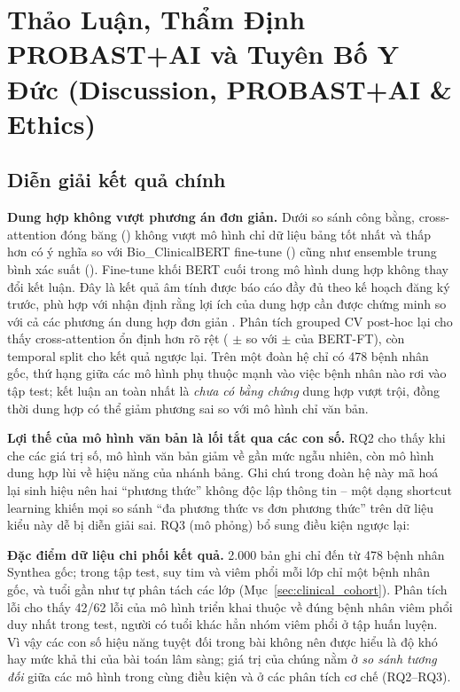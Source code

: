 \section{Thảo Luận, Thẩm Định PROBAST+AI và Tuyên Bố Y Đức (Discussion, PROBAST+AI \& Ethics)}
\label{sec:discussion_ethics}

\subsection{Diễn giải kết quả chính}
\textbf{Dung hợp không vượt phương án đơn giản.} Dưới so sánh công bằng, cross-attention đóng băng (\aucXattn) không vượt mô hình chỉ dữ liệu bảng tốt nhất và thấp hơn có ý nghĩa so với Bio\_ClinicalBERT fine-tune (\aucBertFT) cũng như ensemble trung bình xác suất (\aucEnsemble). Fine-tune khối BERT cuối trong mô hình dung hợp không thay đổi kết luận. Đây là kết quả âm tính được báo cáo đầy đủ theo kế hoạch đăng ký trước, phù hợp với nhận định rằng lợi ích của dung hợp cần được chứng minh so với cả các phương án dung hợp đơn giản \cite{kline2022multimodal}. Phân tích grouped CV post-hoc lại cho thấy cross-attention ổn định hơn rõ rệt (\cvXattn{} $\pm$ \cvsdXattn{} so với \cvBertFT{} $\pm$ \cvsdBertFT{} của BERT-FT), còn temporal split cho kết quả ngược lại. Trên một đoàn hệ chỉ có 478 bệnh nhân gốc, thứ hạng giữa các mô hình phụ thuộc mạnh vào việc bệnh nhân nào rơi vào tập test; kết luận an toàn nhất là \emph{chưa có bằng chứng} dung hợp vượt trội, đồng thời dung hợp có thể giảm phương sai so với mô hình chỉ văn bản.

\textbf{Lợi thế của mô hình văn bản là lối tắt qua các con số.} RQ2 cho thấy khi che các giá trị số, mô hình văn bản giảm về gần mức ngẫu nhiên, còn mô hình dung hợp lùi về hiệu năng của nhánh bảng. Ghi chú trong đoàn hệ này mã hoá lại sinh hiệu nên hai ``phương thức'' không độc lập thông tin -- một dạng shortcut learning \cite{geirhos2020shortcut} khiến mọi so sánh ``đa phương thức vs đơn phương thức'' trên dữ liệu kiểu này dễ bị diễn giải sai. RQ3 (mô phỏng) bổ sung điều kiện ngược lại: 

\textbf{Đặc điểm dữ liệu chi phối kết quả.} 2.000 bản ghi chỉ đến từ 478 bệnh nhân Synthea gốc; trong tập test, suy tim và viêm phổi mỗi lớp chỉ một bệnh nhân gốc, và tuổi gần như tự phân tách các lớp (Mục~\ref{sec:clinical_cohort}). Phân tích lỗi cho thấy 42/62 lỗi của mô hình triển khai thuộc về đúng bệnh nhân viêm phổi duy nhất trong test, người có tuổi khác hẳn nhóm viêm phổi ở tập huấn luyện. Vì vậy các con số hiệu năng tuyệt đối trong bài không nên được hiểu là độ khó hay mức khả thi của bài toán lâm sàng; giá trị của chúng nằm ở \emph{so sánh tương đối} giữa các mô hình trong cùng điều kiện và ở các phân tích cơ chế (RQ2--RQ3).

